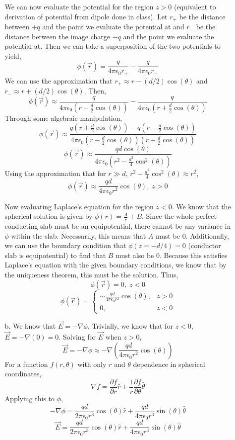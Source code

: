 \documentclass[12pt]{article}
\begin{document}
\begin{enumerate}
\begin{enumerate}
		We can now evaluate the potential for the region $z>0$ (equivalent to derivation of potential from dipole done in class).
		Let $r_+$ be the distance between $+q$ and the point we evaluate the potential at and $r_-$ be the distance between the image charge $-q$ and the point we evaluate the potential at.
		Then we can take a superposition of the two potentials to yield,
		\[\phi(\vec r)=\frac{q}{4\pi\epsilon_0 r_+}-\frac{q}{4\pi\epsilon_0 r_-}\]
		We can use the approximation that $r_+\approx r-(d/2)\cos(\theta)$ and $r_-\approx r+(d/2)\cos(\theta)$.
		Then,
		\[\phi(\vec r)\approx\frac{q}{4\pi\epsilon_0\left(r-\frac{d}{2}\cos(\theta)\right)}-\frac{q}{4\pi\epsilon_0\left(r+\frac{d}{2}\cos(\theta)\right)}\]
		Through some algebraic manipulation,
		\[\phi(\vec r)\approx \frac{q\left(r+\frac{d}{2}\cos(\theta)\right)-q\left(r-\frac{d}{2}\cos(\theta)\right)}{4\pi\epsilon_0\left(r-\frac{d}{2}\cos(\theta)\right)\left(r+\frac{d}{2}\cos(\theta)\right)}\]
		\[\phi(\vec r)\approx \frac{qd\cos(\theta)}{4\pi\epsilon_0\left(r^2-\frac{d^2}{4}\cos^2(\theta)\right)}\]
		Using the approximation that for $r\gg d$, $r^2-\frac{d^2}{4}\cos^2(\theta)\approx r^2$,
		\[\phi(\vec r)\approx\frac{qd}{4\pi\epsilon_0 r^2}\cos(\theta), \; z>0\]

		Now evaluating Laplace's equation for the region $z<0$.
		We know that the spherical solution is given by $\phi(r)=\frac{A}{r}+B$.
		Since the whole perfect conducting slab must be an equipotential, there cannot be any variance in $\phi$ within the slab.
		Necessarily, this means that $A$ must be 0.
		Additionally, we can use the boundary condition that $\phi(z=-d/4)=0$ (conductor slab is equipotential) to find that $B$ must also be 0.
		Because this satisfies Laplace's equation with the given boundary conditions, we know that by the uniqueness theorem, this must be the solution.
		Thus,
		\[\phi(\vec r) =0, \; z< 0\]
		\[\boxed{\phi(\vec r) = \begin{cases}
			\sim \frac{qd}{4\pi\epsilon_0 r^2}\cos(\theta), & z> 0 \\ 
			0, & z<0
		\end{cases}}\]

		\item [b.]
		We know that $\vec E = -\nabla \phi$.
		Trivially, we know that for $z<0$, $\vec E=-\nabla(0) = 0$.
		Solving for $\vec E$ when $z>0$,
		\[\vec E = -\nabla \phi \approx - \nabla\left(\frac{qd}{4\pi\epsilon_0r^2}\cos(\theta)\right)\]
		For a function $f(r,\theta)$ with only $r$ and $\theta$ dependence in spherical coordinates,
		\[\nabla f = \frac{\partial f}{\partial r}\hat r + \frac{1}{r}\frac{\partial f}{\partial \theta}\hat \theta\]
		Applying this to $\phi$,
		\[-\nabla \phi = \frac{qd}{2\pi\epsilon_0r^3}\cos(\theta)\hat r + \frac{qd}{4\pi\epsilon_0r^3}\sin(\theta)\hat \theta\]
		\[\boxed{\vec E = \frac{qd}{2\pi\epsilon_0r^3}\cos(\theta)\hat r + \frac{qd}{4\pi\epsilon_0r^3}\sin(\theta)\hat \theta}\]


\end{enumerate}
\end{enumerate}
\end{document}
